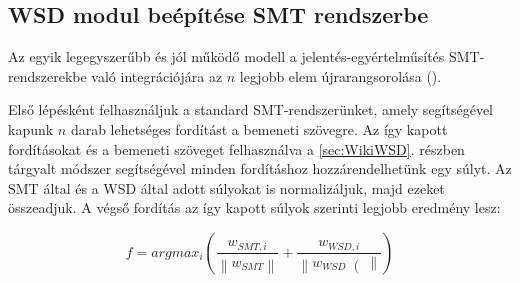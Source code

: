 \subsection{WSD modul beépítése SMT rendszerbe} \label{sec:WSDinSMT}

Az egyik legegyszerűbb és jól működő modell a jelentés-egyértelműsítés SMT-rendszerekbe való integrációjára az $n$ legjobb elem újrarangsorolása (\cite{apidianaki2012wsd}).

Első lépésként felhasználjuk a standard SMT-rendszerünket, amely segítségével kapunk $n$ darab lehetséges fordítást a bemeneti szövegre. Az így kapott fordításokat és a bemeneti szöveget felhasználva a \ref{sec:WikiWSD}. részben tárgyalt módszer segítségével minden fordításhoz hozzárendelhetünk egy súlyt. Az SMT által és a WSD által adott súlyokat is normalizáljuk, majd ezeket összeadjuk. A végső fordítás az így kapott súlyok szerinti legjobb eredmény lesz:

\begin{equation}
	f = argmax_i (\frac{w_{SMT, i}}{\left\lVert w_{SMT} \right\rVert} + \frac{w_{WSD, i}}{\left\lVert w_{WSD} \right(\rVert})
\end{equation}